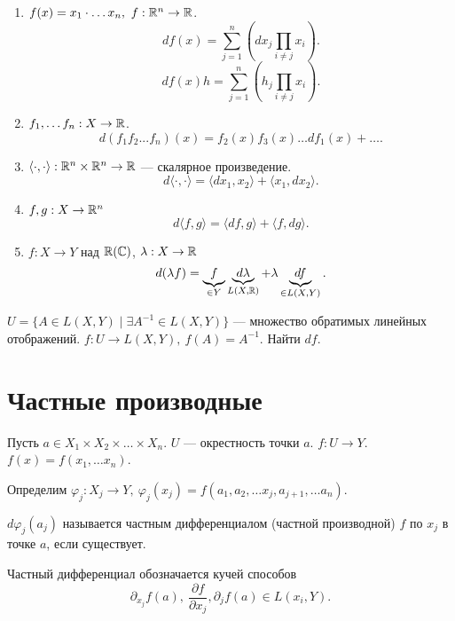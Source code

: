 \begin{prop}
    $ $
    \begin{enumerate}[noitemsep,label={\rm\bf \arabic*)}]
	\item $ f(x) = x_1 \cdot \ldots x_{n}, ~ f: \mathbb{R}^{n} \to  \mathbb{R}$.
	    \[
		df(x) = \sum_{j=1}^{n} \left(dx_j \prod_{i \ne j} x_i\right)
	    .\] 
	    \[
		df(x)h = \sum_{j=1}^{n} \left(h_j \prod_{i \ne j} x_i\right)
	    .\] 
	\item $ f_1, \ldots f_n: X \to  \mathbb{R}$.
	    \[
		d(f_1f_2...f_n) (x)= f_2(x)f_3(x) \ldots df_1(x) + \ldots 
	    .\] 
	\item $ \langle \cdot , \cdot  \rangle: \mathbb{R}^{n}  \times   \mathbb{R}^{n}  \to  \mathbb{R}$ --- скалярное произведение.
	    \[
	    d \langle \cdot , \cdot  \rangle = \langle dx_1, x_2 \rangle + \langle x_1, dx_2 \rangle
	    .\] 
	\item $ f, g: X \to  \mathbb{R}^{n} $
	    \[
	    d \langle f, g \rangle = \langle df, g \rangle  + \langle f, dg \rangle
	    .\] 
	\item $ f: X \to  Y$ над $ \mathbb{R}(\mathbb{C})$, $\lambda : X \to  \mathbb{R}$
\[
    d(\lambda f) = \underbrace{f}_{ \in  Y} \underbrace{d \lambda}_{L(X, \mathbb{R})} + {\lambda}  \underbrace{df}_{ \in L(X, Y)}
.\] 
    \end{enumerate}
\end{prop}
\begin{prac}
    $ U = \{A \in L(X, Y) \mid \exists A^{-1} \in  L(X, Y)\}$ --- множество обратимых линейных отображений.
    $ f: U \to  L(X, Y), ~ f(A) = A^{-1}$. Найти $ df$.
\end{prac}
\section{Частные производные}
\begin{defn}
    Пусть $ a \in  X_1 \times X_2 \times  \ldots  \times X_n$. $ U$ --- окрестность точки $ a$.  $ f: U \to Y$.  $ f(x) = f(x_1, \ldots x_{n})$.

    Определим $ \varphi _j : X_j \to  Y, ~ \varphi _j(x_j) = f(a_1, a_2, \ldots x_j, a_{j+1}, \ldots a_n)$.

    $ d \varphi _j (a_j)$ называется {\sf частным дифференциалом (частной производной)} $ f$ по $ x_j$ в точке $ a$, если существует. 
\end{defn}
\begin{name}
    Частный дифференциал обозначается кучей способов
    \[
	\partial_{x_j}f(a), ~ \frac{ \partial f}{ \partial x_j}, \partial_j f(a) \in L(x_i, Y)
    .\] 
\end{name}

% 
